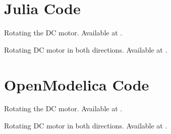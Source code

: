 \section{Julia Code}
\label{sec:dcmotor-julia-code}

\begin{juliacode}
{Rotating the DC motor.  Available at
  .}
\label{julia:dcmotor-clock}

\end{juliacode}

\begin{juliacode}
{Rotating DC motor in both directions.  Available at
  .}
\label{julia:dcmotor-both}

\end{juliacode}

\begin{juliacode}
\label{julia:dcmotor-loop}

\end{juliacode}

\section{OpenModelica Code}
\label{sec:dcmotor-OpenModelica-code}

\begin{OpenModelicacode}
{Rotating the DC motor.  Available at
  .}
\label{OpenModelica:dcmotor-clock}

\end{OpenModelicacode}

\begin{OpenModelicacode}
{Rotating DC motor in both directions.  Available at
  .}
\label{OpenModelica:dcmotor-both}

\end{OpenModelicacode}

\begin{OpenModelicacode}
\label{OpenModelica:dcmotor-loop}

\end{OpenModelicacode}
